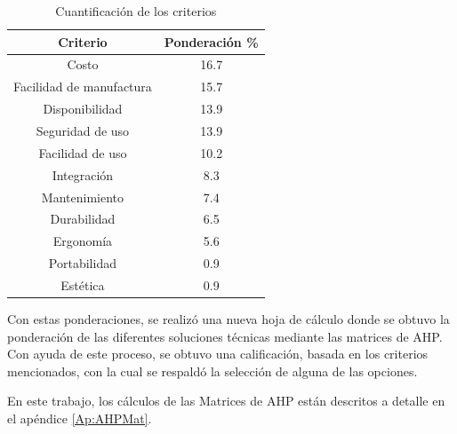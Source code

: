 \begin{table}[h]
    \centering
    \caption{Cuantificación de los criterios} 
    \begin{tabular}{|c|c|}
    \hline
        Criterio & Ponderación \% \\ \hline
        Costo &  16.7 \\ \hline
        Facilidad de manufactura & 15.7  \\ \hline
        Disponibilidad & 13.9  \\ \hline
        Seguridad de uso & 13.9 \\ \hline
        Facilidad de uso & 10.2  \\ \hline
        Integración & 8.3  \\ \hline
        Mantenimiento & 7.4 \\ \hline
        Durabilidad & 6.5 \\ \hline
        Ergonomía & 5.6 \\   \hline
        Portabilidad & 0.9  \\  \hline
        Estética & 0.9 \\ \hline
    \end{tabular}
    \label{tab:Cuanticrit}
\end{table}

Con estas ponderaciones, se realizó una nueva hoja de cálculo donde se obtuvo la ponderación de las diferentes soluciones técnicas mediante las matrices de AHP. Con ayuda de este proceso, se obtuvo una calificación, basada en los criterios mencionados, con la cual se respaldó la selección de alguna de las opciones.

En este trabajo, los cálculos de las Matrices de AHP están descritos a detalle en el apéndice \ref{Ap:AHPMat}.
